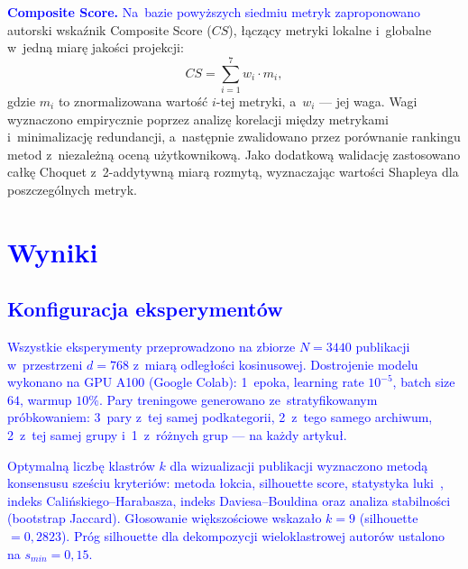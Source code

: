 \documentclass[a4paper,11pt,twocolumn]{article}
\newcommand{\hl}[1]{\textcolor{blue}{#1}}
\begin{document}
\hl{\textbf{Composite Score.}}
\hl{Na~bazie powyższych siedmiu metryk zaproponowano} autorski wskaźnik
Composite Score ($CS$), łączący metryki lokalne i~globalne w~jedną
miarę jakości projekcji:
\begin{equation}
  CS = \sum_{i=1}^{7} w_i \cdot m_i,
  \label{eq:composite}
\end{equation}
gdzie $m_i$ to znormalizowana wartość $i$-tej metryki, a~$w_i$ ---
jej waga. Wagi wyznaczono
empirycznie poprzez analizę korelacji między metrykami i~minimalizację
redundancji, a~następnie zwalidowano przez porównanie rankingu metod
z~niezależną oceną użytkownikową. Jako dodatkową walidację zastosowano
całkę Choquet z~2-addytywną miarą rozmytą, wyznaczając wartości Shapleya
dla poszczególnych metryk.


\section{\hl{Wyniki}}
\label{sec:results}

\subsection{\hl{Konfiguracja eksperymentów}}

\hl{Wszystkie eksperymenty przeprowadzono na zbiorze $N=3440$ publikacji
w~przestrzeni $d=768$ z~miarą odległości kosinusowej. Dostrojenie modelu
wykonano na GPU A100 (Google Colab): 1~epoka, learning rate $10^{-5}$,
batch size $64$, warmup $10\%$. Pary treningowe generowano ze~stratyfikowanym
próbkowaniem: 3~pary z~tej samej podkategorii, 2~z~tego samego archiwum,
2~z~tej samej grupy i~1~z~różnych grup --- na każdy artykuł.}

\hl{Optymalną liczbę klastrów $k$ dla wizualizacji publikacji wyznaczono
metodą konsensusu sześciu kryteriów: metoda łokcia, silhouette score,
statystyka luki~\cite{tibshirani2001}, indeks Calińskiego--Harabasza,
indeks Daviesa--Bouldina oraz analiza stabilności (bootstrap Jaccard).
Głosowanie większościowe wskazało $k=9$
(silhouette $=0{,}2823$). Próg silhouette dla dekompozycji
wieloklastrowej autorów ustalono na $s_{min}=0{,}15$.}


\end{document}
